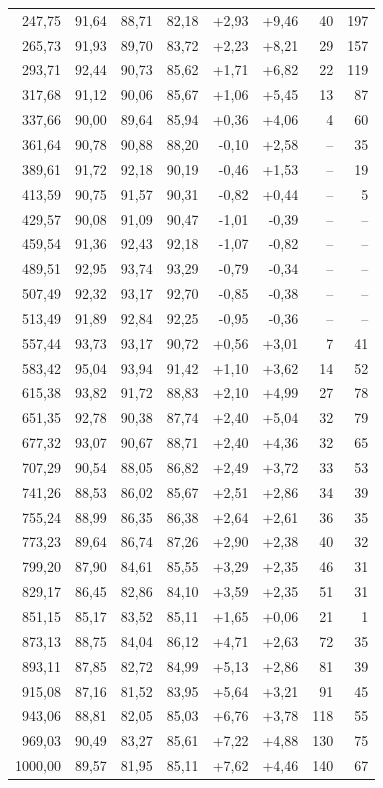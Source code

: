 \documentclass[11pt,a4paper]{article}
\begin{document}
{\begin{longtable}{rrrrrrrr}
    247,75 & 91,64 & 88,71 & 82,18 & +2,93 & +9,46 & 40 & 197 \\
    265,73 & 91,93 & 89,70 & 83,72 & +2,23 & +8,21 & 29 & 157 \\
    293,71 & 92,44 & 90,73 & 85,62 & +1,71 & +6,82 & 22 & 119 \\
    317,68 & 91,12 & 90,06 & 85,67 & +1,06 & +5,45 & 13 & 87 \\
    337,66 & 90,00 & 89,64 & 85,94 & +0,36 & +4,06 & 4 & 60 \\
    361,64 & 90,78 & 90,88 & 88,20 & -0,10 & +2,58 & -- & 35 \\
    389,61 & 91,72 & 92,18 & 90,19 & -0,46 & +1,53 & -- & 19 \\
    413,59 & 90,75 & 91,57 & 90,31 & -0,82 & +0,44 & -- & 5 \\
    429,57 & 90,08 & 91,09 & 90,47 & -1,01 & -0,39 & -- & -- \\
    459,54 & 91,36 & 92,43 & 92,18 & -1,07 & -0,82 & -- & -- \\
    489,51 & 92,95 & 93,74 & 93,29 & -0,79 & -0,34 & -- & -- \\
    507,49 & 92,32 & 93,17 & 92,70 & -0,85 & -0,38 & -- & -- \\
    513,49 & 91,89 & 92,84 & 92,25 & -0,95 & -0,36 & -- & -- \\
    557,44 & 93,73 & 93,17 & 90,72 & +0,56 & +3,01 & 7 & 41 \\
    583,42 & 95,04 & 93,94 & 91,42 & +1,10 & +3,62 & 14 & 52 \\
    615,38 & 93,82 & 91,72 & 88,83 & +2,10 & +4,99 & 27 & 78 \\
    651,35 & 92,78 & 90,38 & 87,74 & +2,40 & +5,04 & 32 & 79 \\
    677,32 & 93,07 & 90,67 & 88,71 & +2,40 & +4,36 & 32 & 65 \\
    707,29 & 90,54 & 88,05 & 86,82 & +2,49 & +3,72 & 33 & 53 \\
    741,26 & 88,53 & 86,02 & 85,67 & +2,51 & +2,86 & 34 & 39 \\
    755,24 & 88,99 & 86,35 & 86,38 & +2,64 & +2,61 & 36 & 35 \\
    773,23 & 89,64 & 86,74 & 87,26 & +2,90 & +2,38 & 40 & 32 \\
    799,20 & 87,90 & 84,61 & 85,55 & +3,29 & +2,35 & 46 & 31 \\
    829,17 & 86,45 & 82,86 & 84,10 & +3,59 & +2,35 & 51 & 31 \\
    851,15 & 85,17 & 83,52 & 85,11 & +1,65 & +0,06 & 21 & 1 \\
    873,13 & 88,75 & 84,04 & 86,12 & +4,71 & +2,63 & 72 & 35 \\
    893,11 & 87,85 & 82,72 & 84,99 & +5,13 & +2,86 & 81 & 39 \\
    915,08 & 87,16 & 81,52 & 83,95 & +5,64 & +3,21 & 91 & 45 \\
    943,06 & 88,81 & 82,05 & 85,03 & +6,76 & +3,78 & 118 & 55 \\
    969,03 & 90,49 & 83,27 & 85,61 & +7,22 & +4,88 & 130 & 75 \\
    1000,00 & 89,57 & 81,95 & 85,11 & +7,62 & +4,46 & 140 & 67 \\
  \end{longtable}}
\end{document}
